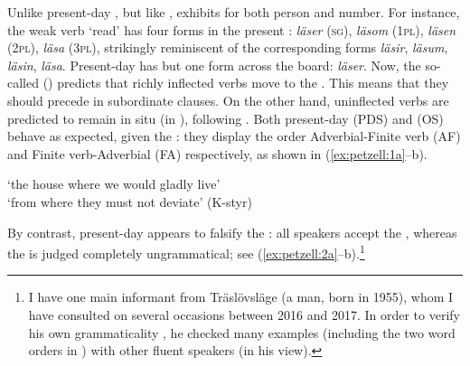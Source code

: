 \documentclass[output=paper,colorlinks,citecolor=brown,draft,draftmode]{langscibook}
\begin{document}
Unlike present-day , but like ,  exhibits  for both person and number. For instance, the weak verb ‘read’ has four forms in the present : \textit{läser} (\textsc{sg}), \textit{läsom} (1\textsc{pl}), \textit{läsen} (2\textsc{pl}), \textit{läsa} (3\textsc{pl}), strikingly reminiscent of the corresponding  forms \textit{läsir}, \textit{läsum}, \textit{läsin}, \textit{läsa}. Present-day  has but one form across the board: \textit{läser}. Now, the so-called  () predicts that richly inflected verbs move to the . This means that they should precede  in subordinate clauses. On the other hand, uninflected verbs are predicted to remain {in situ} (in ), following . Both present-day  (PDS) and  (OS) behave as expected, given the : they display the order Adverbial-Finite verb (AF) and Finite verb-Adverbial (FA) respectively, as shown in (\ref{ex:petzell:1a}–b).


\ea\label{ex:petzell:1}
\glt `the house where we would gladly live’  \\
\glt `from where they must not deviate’ (K-styr)
\z
\z


By contrast, present-day  appears to falsify the : all speakers accept the , whereas the  is judged completely ungrammatical; see (\ref{ex:petzell:2a}–b).\footnote{I have one main informant from Träslövsläge (a man, born in 1955), whom I have consulted on several occasions between 2016 and 2017. In order to verify his own grammaticality , he checked many examples (including the two word orders in ) with other fluent  speakers (in his view).}
\end{document}
